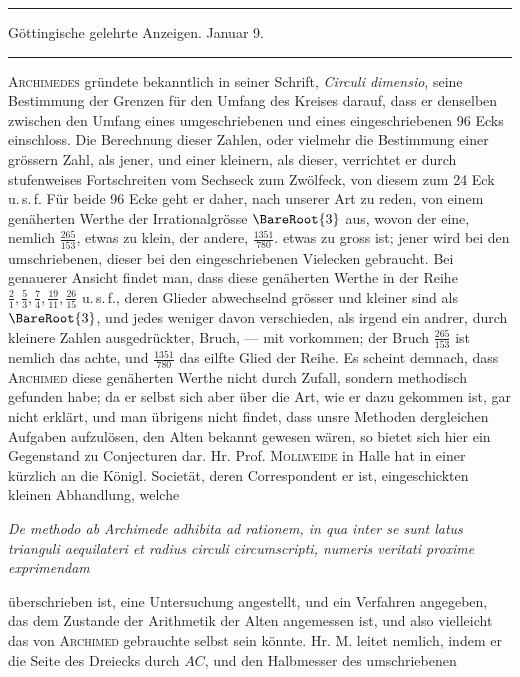 \clearpage
{}%
\begin{center}
\rule{.85\textwidth}{.3pt}\par
Göttingische gelehrte Anzeigen. Januar 9.\par
\rule{.85\textwidth}{.3pt}
\end{center}
\hspace*{\parindent}\textsc{Archimedes} gründete bekanntlich in seiner Schrift, \textit{Circuli dimensio}, seine Bestimmung der Grenzen für den Umfang des Kreises darauf, dass er denselben zwischen den Umfang eines umgeschriebenen und eines eingeschriebenen 96 Ecks einschloss. Die Berechnung dieser Zahlen, oder vielmehr die Bestimmung einer grössern Zahl, als jener, und einer kleinern, als dieser, verrichtet er durch stufenweises Fortschreiten vom Sechseck zum Zwölfeck, von diesem zum 24 Eck u.\,s.\,f. Für beide 96 Ecke geht er daher, nach unserer Art zu reden, von einem genäherten Werthe der Irrationalgrösse \(\BareRoot{3}\) aus, wovon der eine, nemlich \(\frac{265}{153}\), etwas zu klein, der andere, \(\frac{1351}{780}\). etwas zu gross ist; jener wird bei den umschriebenen, dieser bei den eingeschriebenen Vielecken gebraucht. Bei genauerer Ansicht findet man, dass diese genäherten Werthe in der Reihe \(\frac21,\frac53,\frac74,\frac{19}{11},\frac{26}{15}\) u.\,s.\,f., deren Glieder abwechselnd grösser und kleiner sind als \(\BareRoot{3}\), und jedes weniger davon verschieden, als irgend ein andrer, durch kleinere Zahlen ausgedrückter, Bruch, --- mit vorkommen; der Bruch \(\frac{265}{153}\) ist nemlich das achte, und \(\frac{1351}{780}\) das eilfte Glied der Reihe. Es scheint demnach, dass \textsc{Archimed} diese genäherten Werthe nicht durch Zufall, sondern methodisch gefunden habe; da er selbst sich aber über die Art, wie er dazu gekommen ist, gar nicht erklärt, und man übrigens nicht findet, dass unsre Methoden dergleichen Aufgaben aufzulösen, den Alten bekannt gewesen wären, so bietet sich hier ein Gegenstand zu Conjecturen dar. Hr. Prof. \textsc{Mollweide} in Halle hat in einer kürzlich an die Königl. Societät, deren Correspondent er ist, eingeschickten kleinen Abhandlung, welche
\begin{center}\textit{De methodo ab Archimede adhibita ad rationem, in qua inter se sunt latus trianguli aequilateri et radius circuli circumscripti, numeris veritati proxime exprimendam}\end{center}
\noindent überschrieben ist, eine Untersuchung angestellt, und ein Verfahren angegeben, das dem Zustande der Arithmetik der Alten angemessen ist, und also vielleicht das von \textsc{Archimed} gebrauchte selbst sein könnte. Hr. M. leitet nemlich, indem er die Seite des Dreiecks durch \(AC\), und den Halbmesser des umschriebenen
